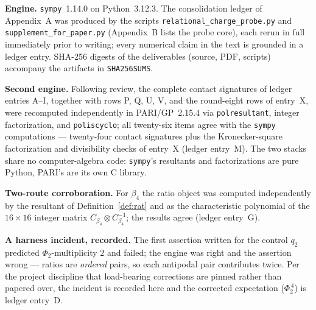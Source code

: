 \documentclass[11pt]{article}
\theoremstyle{plain}
\theoremstyle{definition}
\theoremstyle{remark}
\begin{document}
\textbf{Engine.} \texttt{sympy}~1.14.0 on Python~3.12.3. The consolidation
ledger of Appendix~A was produced by the scripts
\texttt{relational\_charge\_probe.py} and \texttt{supplement\_for\_paper.py}
(Appendix~B lists the probe core), each rerun in full immediately prior to
writing; every numerical claim in the text is grounded in a ledger entry. SHA-256
digests of the deliverables (source, PDF, scripts) accompany the artifacts
in \texttt{SHA256SUMS}.

\textbf{Second engine.} Following review, the complete contact signatures
of ledger entries A--I, together with rows P, Q, U, V, and the round-eight
rows of entry~X, were
recomputed independently in PARI/GP~2.15.4 via
\texttt{polresultant}, integer factorization, and \texttt{poliscyclo}; all
twenty-six items agree with the \texttt{sympy} computations ---
twenty-four contact signatures plus the Kronecker-square factorization and
divisibility checks of entry~X (ledger
entry~M). The two stacks share no computer-algebra code: \texttt{sympy}'s
resultants and factorizations are pure Python, PARI's are its own C library.

\textbf{Two-route corroboration.} For $\beta_4$ the ratio object was computed
independently by the resultant of Definition~\ref{def:rat} and as the
characteristic polynomial of the $16\times16$ integer matrix
$C_{\beta_4}\otimes C_{\beta_4}^{-1}$; the results agree (ledger entry~G).

\textbf{A harness incident, recorded.} The first assertion written for the
control $q_2$ predicted $\Phi_2$-multiplicity $2$ and failed; the engine was
right and the assertion wrong --- ratios are \emph{ordered} pairs, so each
antipodal pair contributes twice. Per the project discipline that load-bearing
corrections are pinned rather than papered over, the incident is recorded here
and the corrected expectation ($\Phi_2^{\,4}$) is ledger entry~D.
\end{document}
